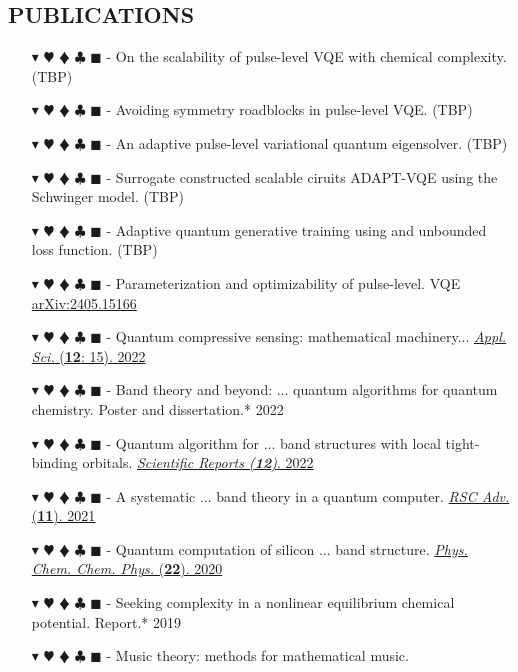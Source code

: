\documentclass[overlapped, 10pt]{res} %
\newcommand{\physics}{$\blacktriangledown$}
\newcommand{\biochem}{$\varheartsuit$}
\newcommand{\shannon}{$\vardiamondsuit$}
\newcommand{\classic}{$\clubsuit$}
\newcommand{\quantum}{$\blacksquare$}
\newcommand{\physicscolor}{\color{YellowOrange}}
\newcommand{\biochemcolor}{\color{Emerald}}
\newcommand{\shannoncolor}{\color{Goldenrod}}
\newcommand{\classiccolor}{\color{Cyan}}
\newcommand{\quantumcolor}{\color{RedOrange}}
\newcommand{\tag}[1]{
    {\IfSubStr{#1}{\physics}{\physicscolor}{\color{White}}\physics}
    {\IfSubStr{#1}{\biochem}{\biochemcolor}{\color{White}}\biochem}
    {\IfSubStr{#1}{\shannon}{\shannoncolor}{\color{White}}\shannon}
    {\IfSubStr{#1}{\classic}{\classiccolor}{\color{White}}\classic}
    {\IfSubStr{#1}{\quantum}{\quantumcolor}{\color{White}}\quantum}
}
\begin{document}
\begin{resume}
\section{PUBLICATIONS}
\begin{itemize} \itemsep -2pt %
\item[\tag{\physics\biochem\shannon\quantum}-] On the scalability of pulse-level VQE with chemical complexity. \hfill (TBP)
\item[\tag{\physics\biochem\shannon\quantum}-] Avoiding symmetry roadblocks in pulse-level VQE. \hfill (TBP)
\item[\tag{\physics\biochem\shannon\quantum}-] An adaptive pulse-level variational quantum eigensolver. \hfill (TBP)
\item[\tag{\physics\quantum}-] Surrogate constructed scalable ciruits ADAPT-VQE using the Schwinger model. \hfill (TBP)
\item[\tag{\physics\shannon\quantum}-] Adaptive quantum generative training using and unbounded loss function. \hfill (TBP)
\item[\tag{\physics\biochem\quantum}-] Parameterization and optimizability of pulse-level. VQE \hfill \href{https://arxiv.org/abs/2405.15166}{arXiv:2405.15166}
\item[\tag{\shannon\quantum}-] Quantum compressive sensing: mathematical machinery...
    \hfill \href{https://arxiv.org/abs/2204.13035}{\textit{Appl. Sci.} (\textbf{12}: 15). 2022}
\item[\tag{\physics\biochem\shannon\quantum}-] Band theory and beyond: ... quantum algorithms for quantum chemistry.
    \hfill Poster and dissertation.* 2022
\item[\tag{\physics\quantum}-] Quantum algorithm for ... band structures with local tight-binding orbitals.
    \hfill \href{https://doi.org/10.21203/rs.3.rs-1318951/v1}{\textit{Scientific Reports (\textbf{12})}. 2022}
\item[\tag{\physics\quantum}-] A systematic ... band theory in a quantum computer.
    \hfill \href{https://arxiv.org/abs/2104.03409}{\textit{RSC Adv.} (\textbf{11}). 2021}
\item[\tag{\physics\quantum}-] Quantum computation of silicon ... band structure.
    \hfill \href{https://arxiv.org/abs/2006.03807}{\textit{Phys. Chem. Chem. Phys.} (\textbf{22}). 2020}
\item[\tag{\biochem}-] Seeking complexity in a nonlinear equilibrium chemical potential.
    \hfill Report.* 2019
\item[\tag{}-] Music theory: methods for mathematical music.

\end{itemize}
\end{resume}
\end{document}
